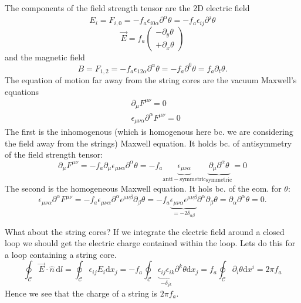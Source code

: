 \documentclass[a4paper]{article}
\begin{document}
The components of the field strength tensor are the 2D electric field
\begin{equation}
	E_i = F_{i,0} = - f_a \epsilon_{i 0 \alpha} \partial^\alpha \theta = - f_a \epsilon_{i j} \partial^j \theta
\end{equation}
\begin{equation}
	\vec{E} = f_a \begin{pmatrix}
		-\partial_y \theta \\
		+\partial_x \theta
	\end{pmatrix}
\end{equation}
and the magnetic field 
\begin{equation}
	B = F_{1,2} = - f_a \epsilon_{1 2 \alpha} \partial^\alpha \theta = - f_a \partial^0 \theta = f_a \partial_t \theta.
\end{equation}
The equation of motion far away from the string cores are the vacuum Maxwell's equations
\begin{align}
	&\partial_\mu F^{\mu \nu} = 0 \\
	&\epsilon_{\mu \nu \alpha} \partial^\alpha F^{\mu \nu} = 0
\end{align}
The first is the inhomogenous (which is homogenous here bc. we are considering the field away from the strings) Maxwell equation. It holds bc. of antisymmetry of the field strength tensor:
\begin{equation}
	\partial_\mu F^{\mu \nu} =  - f_a \partial_\mu  \epsilon_{\mu \nu \alpha} \partial^\alpha \theta
	=  - f_a  \underbrace{\epsilon_{\mu \nu \alpha}}_{\mathrm{anti-symmetric}} \underbrace{\partial_\mu \partial^\alpha \theta}_{\mathrm{symmetric}} = 0
\end{equation}
The second is the homogeneous Maxwell equation. It hols bc. of the eom. for $\theta$:
\begin{equation}
	\epsilon_{\mu \nu \alpha} \partial^\alpha F^{\mu \nu} = - f_a \epsilon_{\mu \nu \alpha} \partial^\alpha \epsilon^{\mu \nu \beta} \partial_\beta \theta
	= - f_a \underbrace{\epsilon_{\mu \nu \alpha} \epsilon^{\mu \nu \beta}}_{= -2 \delta_{\alpha \beta}} \partial^\alpha \partial_\beta \theta = \partial_\alpha \partial^\alpha \theta = 0.
\end{equation}

What about the string cores?
If we integrate the electric field around a closed loop we should get the electric charge contained within the loop.
Lets do this for a loop containing a string core.
\begin{equation}
	\oint_\mathcal{C} \vec{E} \cdot \hat{n} \, \mathrm{d} l = \oint_\mathcal{C} \epsilon_{i j} E_i \mathrm{d} x_j = - f_a \oint_\mathcal{C} \underbrace{\epsilon_{i j}  \epsilon_{i k}}_{- \delta_{j k}} \partial^k \theta \mathrm{d} x_j =  f_a \oint_\mathcal{C} \partial_i \theta \mathrm{d}x^i = 2 \pi f_a
\end{equation}
Hence we see that the charge of a string is $2 \pi f_a$.
\end{document}
